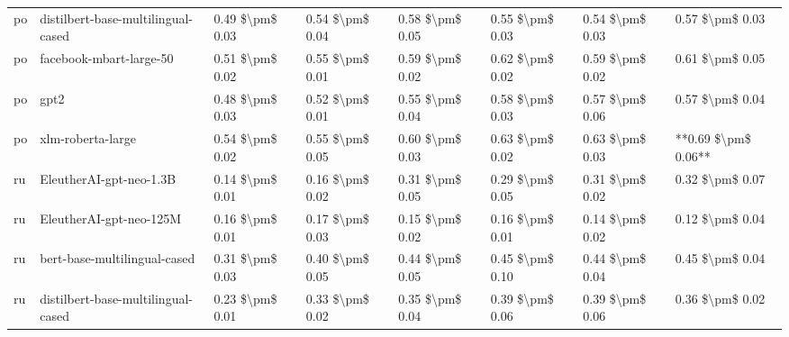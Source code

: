 \begin{tabular}{llllllll}
      po & distilbert-base-multilingual-cased & 0.49 \$\textbackslash pm\$ 0.03 &           0.54 \$\textbackslash pm\$ 0.04 &       0.58 \$\textbackslash pm\$ 0.05 &        0.55 \$\textbackslash pm\$ 0.03 &                         0.54 \$\textbackslash pm\$ 0.03 &     0.57 \$\textbackslash pm\$ 0.03 \\
      po &            facebook-mbart-large-50 & 0.51 \$\textbackslash pm\$ 0.02 &           0.55 \$\textbackslash pm\$ 0.01 &       0.59 \$\textbackslash pm\$ 0.02 &        0.62 \$\textbackslash pm\$ 0.02 &                         0.59 \$\textbackslash pm\$ 0.02 &     0.61 \$\textbackslash pm\$ 0.05 \\
      po &                               gpt2 & 0.48 \$\textbackslash pm\$ 0.03 &           0.52 \$\textbackslash pm\$ 0.01 &       0.55 \$\textbackslash pm\$ 0.04 &        0.58 \$\textbackslash pm\$ 0.03 &                         0.57 \$\textbackslash pm\$ 0.06 &     0.57 \$\textbackslash pm\$ 0.04 \\
      po &                  xlm-roberta-large & 0.54 \$\textbackslash pm\$ 0.02 &           0.55 \$\textbackslash pm\$ 0.05 &       0.60 \$\textbackslash pm\$ 0.03 &        0.63 \$\textbackslash pm\$ 0.02 &                         0.63 \$\textbackslash pm\$ 0.03 & **0.69 \$\textbackslash pm\$ 0.06** \\
      ru &            EleutherAI-gpt-neo-1.3B & 0.14 \$\textbackslash pm\$ 0.01 &           0.16 \$\textbackslash pm\$ 0.02 &       0.31 \$\textbackslash pm\$ 0.05 &        0.29 \$\textbackslash pm\$ 0.05 &                         0.31 \$\textbackslash pm\$ 0.02 &     0.32 \$\textbackslash pm\$ 0.07 \\
      ru &            EleutherAI-gpt-neo-125M & 0.16 \$\textbackslash pm\$ 0.01 &           0.17 \$\textbackslash pm\$ 0.03 &       0.15 \$\textbackslash pm\$ 0.02 &        0.16 \$\textbackslash pm\$ 0.01 &                         0.14 \$\textbackslash pm\$ 0.02 &     0.12 \$\textbackslash pm\$ 0.04 \\
      ru &       bert-base-multilingual-cased & 0.31 \$\textbackslash pm\$ 0.03 &           0.40 \$\textbackslash pm\$ 0.05 &       0.44 \$\textbackslash pm\$ 0.05 &        0.45 \$\textbackslash pm\$ 0.10 &                         0.44 \$\textbackslash pm\$ 0.04 &     0.45 \$\textbackslash pm\$ 0.04 \\
      ru & distilbert-base-multilingual-cased & 0.23 \$\textbackslash pm\$ 0.01 &           0.33 \$\textbackslash pm\$ 0.02 &       0.35 \$\textbackslash pm\$ 0.04 &        0.39 \$\textbackslash pm\$ 0.06 &                         0.39 \$\textbackslash pm\$ 0.06 &     0.36 \$\textbackslash pm\$ 0.02 \\

\end{tabular}
